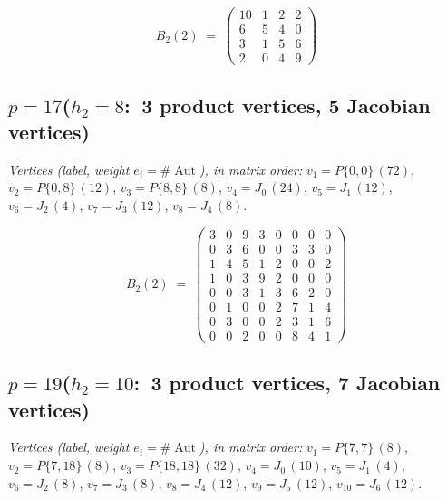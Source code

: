 \documentclass[11pt]{amsart}
\theoremstyle{plain}
\theoremstyle{definition}
\begin{document}
	\begingroup\small\setlength{\arraycolsep}{4pt}
	\[ B_2(2)\;=\;\left(\begin{array}{*{4}{r}}
		10 & 1 & 2 & 2 \\
		6 & 5 & 4 & 0 \\
		3 & 1 & 5 & 6 \\
		2 & 0 & 4 & 9
	\end{array}\right) \]
	\endgroup
	
	\subsection*{\texorpdfstring{$p=17$\quad ($h_2=8$:\ 3 product vertices, 5 Jacobian vertices)}{p=17 (h2=8: 3 product vertices, 5 Jacobian vertices)}}
	\begin{sloppypar}\noindent\small\textit{Vertices (label, weight $e_i=\#\operatorname{Aut}$), in matrix order:} $v_{1}{=}P\{0,0\}\,(72)$, $v_{2}{=}P\{0,8\}\,(12)$, $v_{3}{=}P\{8,8\}\,(8)$, $v_{4}{=}J_{0}\,(24)$, $v_{5}{=}J_{1}\,(12)$, $v_{6}{=}J_{2}\,(4)$, $v_{7}{=}J_{3}\,(12)$, $v_{8}{=}J_{4}\,(8)$.\end{sloppypar}
	
	\begingroup\small\setlength{\arraycolsep}{4pt}
	\[ B_2(2)\;=\;\left(\begin{array}{*{8}{r}}
		3 & 0 & 9 & 3 & 0 & 0 & 0 & 0 \\
		0 & 3 & 6 & 0 & 0 & 3 & 3 & 0 \\
		1 & 4 & 5 & 1 & 2 & 0 & 0 & 2 \\
		1 & 0 & 3 & 9 & 2 & 0 & 0 & 0 \\
		0 & 0 & 3 & 1 & 3 & 6 & 2 & 0 \\
		0 & 1 & 0 & 0 & 2 & 7 & 1 & 4 \\
		0 & 3 & 0 & 0 & 2 & 3 & 1 & 6 \\
		0 & 0 & 2 & 0 & 0 & 8 & 4 & 1
	\end{array}\right) \]
	\endgroup
	
	\subsection*{\texorpdfstring{$p=19$\quad ($h_2=10$:\ 3 product vertices, 7 Jacobian vertices)}{p=19 (h2=10: 3 product vertices, 7 Jacobian vertices)}}
	\begin{sloppypar}\noindent\small\textit{Vertices (label, weight $e_i=\#\operatorname{Aut}$), in matrix order:} $v_{1}{=}P\{7,7\}\,(8)$, $v_{2}{=}P\{7,18\}\,(8)$, $v_{3}{=}P\{18,18\}\,(32)$, $v_{4}{=}J_{0}\,(10)$, $v_{5}{=}J_{1}\,(4)$, $v_{6}{=}J_{2}\,(8)$, $v_{7}{=}J_{3}\,(8)$, $v_{8}{=}J_{4}\,(12)$, $v_{9}{=}J_{5}\,(12)$, $v_{10}{=}J_{6}\,(12)$.\end{sloppypar}
	
\end{document}
